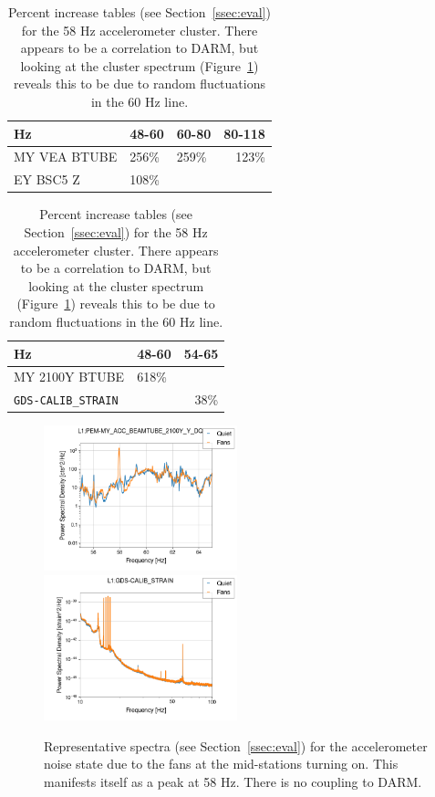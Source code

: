 \documentclass[colorlinks=true,pdfstartview=FitV,linkcolor=blue,
            citecolor=red,urlcolor=magenta]{ligodoc}
\begin{document}
\begin{table}
  \begin{tabular}{l|llr}
    Hz    &       48-60 & 60-80 & 80-118 \\ \hline
    MY VEA BTUBE & 256\% & 259\% & 123\% \\
    EY BSC5 Z  &  108\% \\
  \end{tabular}\hfill
  \begin{tabular}{l|lr}
    Hz         &      48-60 & 54-65 \\ \hline
    MY 2100Y BTUBE &  618\%   & \\
    \texttt{GDS-CALIB\_STRAIN}  &&     38\%
  \end{tabular}
  \caption{Percent increase tables (see Section~\ref{ssec:eval}) for the 58 Hz accelerometer cluster. There appears to be a correlation to DARM, but looking at the cluster spectrum (Figure~\ref{fig:acc}) reveals this to be due to random fluctuations in the 60 Hz line.}\label{tab:acc}
\end{table}


\begin{figure}
  \includegraphics[width=0.5\textwidth]{assets/final/L1_PEM-MY_ACC_BEAMTUBE_2100Y_Y_DQ.png}
  \includegraphics[width=0.5\textwidth]{assets/final/L1_GDS-CALIB_STRAIN-acc.png}
  \caption{Representative spectra (see Section~\ref{ssec:eval}) for the accelerometer noise state due to the fans at the mid-stations turning on. This manifests itself as a peak at 58 Hz. There is no coupling to DARM.}\label{fig:acc}
\end{figure}
\end{document}
